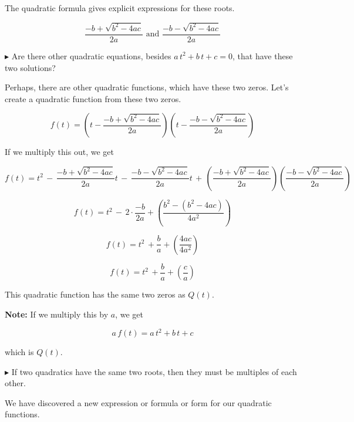 \documentclass{ximera}
\begin{document}
The quadratic formula gives explicit expressions for these roots.


\[   \frac{-b + \sqrt{b^2 - 4 a c}}{2a}     \text{ and }    \frac{-b - \sqrt{b^2 - 4 a c}}{2a}   \]





$\blacktriangleright$  Are there other quadratic equations, besides $a \, t^2 + b \, t + c = 0$, that have these two solutions?















Perhaps, there are other quadratic functions, which have these two zeros. Let's create a quadratic function from these two zeros.



\[ f(t) =  \left(t - \frac{-b + \sqrt{b^2 - 4 a c}}{2a}\right)   \left(t -  \frac{-b - \sqrt{b^2 - 4 a c}}{2a}\right)   \]


If we multiply this out, we get



\[ f(t) =   t^2 \, - \, \frac{-b + \sqrt{b^2 - 4 a c}}{2a} t \, - \, \frac{-b - \sqrt{b^2 - 4 a c}}{2a}  t \, + \, \left(\frac{-b + \sqrt{b^2 - 4 a c}}{2a}\right) \left(\frac{-b - \sqrt{b^2 - 4 a c}}{2a}\right) \]


\[ f(t) = t^2  \, - \, 2 \cdot \frac{-b}{2a} + \left(    \frac{b^2 - (b^2 - 4 a c)}{4 a^2}     \right)        \]


\[ f(t) = t^2  \, + \frac{b}{a} + \left(    \frac{4 a c}{4 a^2}     \right)        \]

\[ f(t) = t^2  \, +  \frac{b}{a} + \left(    \frac{c}{a}     \right)        \]


This quadratic function has the same two zeros as $Q(t)$.  


\textbf{Note:} If we multiply this by $a$, we get 


\[ a \, f(t) = a \, t^2 + b \, t + c \]

which is $Q(t)$.


$\blacktriangleright$ If two quadratics have the same two roots, then they must be multiples of each other.






We have discovered a new expression or formula or form for our quadratic functions.
\end{document}
